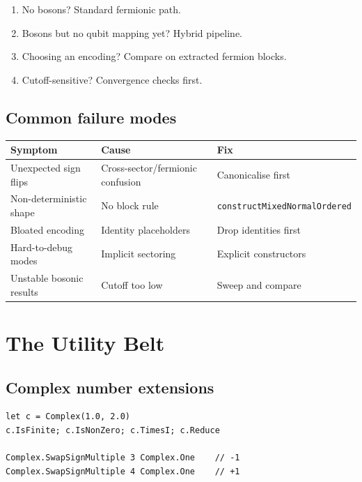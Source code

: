 \documentclass[10pt,a4paper]{article}
\begin{document}
\begin{enumerate}[nosep]
  \item No bosons? Standard fermionic path.
  \item Bosons but no qubit mapping yet? Hybrid pipeline.
  \item Choosing an encoding? Compare on extracted fermion blocks.
  \item Cutoff-sensitive? Convergence checks first.
\end{enumerate}

\subsection{Common failure modes}

\begin{center}
\small
\begin{tabular}{lll}
\toprule
\textbf{Symptom} & \textbf{Cause} & \textbf{Fix} \\
\midrule
Unexpected sign flips & Cross-sector/fermionic confusion & Canonicalise first \\
Non-deterministic shape & No block rule & \texttt{constructMixedNormalOrdered} \\
Bloated encoding & Identity placeholders & Drop identities first \\
Hard-to-debug modes & Implicit sectoring & Explicit constructors \\
Unstable bosonic results & Cutoff too low & Sweep and compare \\
\bottomrule
\end{tabular}
\end{center}


\section{The Utility Belt}\label{ch:utils}

\subsection{Complex number extensions}

\begin{lstlisting}
let c = Complex(1.0, 2.0)
c.IsFinite; c.IsNonZero; c.TimesI; c.Reduce

Complex.SwapSignMultiple 3 Complex.One    // -1
Complex.SwapSignMultiple 4 Complex.One    // +1
\end{lstlisting}
\end{document}

